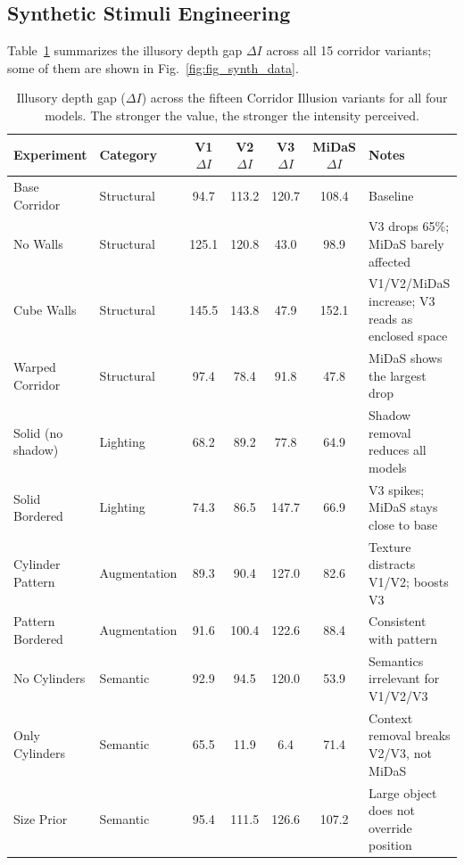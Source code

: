 \documentclass[10pt,twocolumn]{article}
\begin{document}
\subsection{Synthetic Stimuli Engineering}

Table~\ref{tab:corridor} summarizes the illusory depth gap $\Delta I$ across all 15
corridor variants; some of them are shown in Fig.~\ref{fig:fig_synth_data}. 
\begin{table}[t]
\centering
\caption{Illusory depth gap ($\Delta I$) across the fifteen Corridor Illusion variants for
all four models.  The stronger the value, the stronger the intensity perceived.}
\label{tab:corridor}
\small
\setlength{\tabcolsep}{0pt} %
\begin{tabular*}{\textwidth}{@{\extracolsep{\fill}}llccccl@{}} %
\toprule
\textbf{Experiment} & \textbf{Category} & \textbf{V1 $\Delta I$} & \textbf{V2 $\Delta I$} & \textbf{V3 $\Delta I$} & \textbf{MiDaS $\Delta I$} & \textbf{Notes} \\
\midrule
Base Corridor        & Structural   & 94.7  & 113.2 & 120.7 & 108.4 & Baseline \\
No Walls             & Structural   & 125.1 & 120.8 &  43.0 &  98.9 & V3 drops 65\%; MiDaS barely affected \\
Cube Walls           & Structural   & 145.5 & 143.8 &  47.9 & 152.1 & V1/V2/MiDaS increase; V3 reads as enclosed space \\
Warped Corridor      & Structural   &  97.4 &  78.4 &  91.8 &  47.8 & MiDaS shows the largest drop \\
Solid (no shadow)    & Lighting     &  68.2 &  89.2 &  77.8 &  64.9 & Shadow removal reduces all models \\
Solid Bordered       & Lighting     &  74.3 &  86.5 & 147.7 &  66.9 & V3 spikes; MiDaS stays close to base \\
Cylinder Pattern     & Augmentation &  89.3 &  90.4 & 127.0 &  82.6 & Texture distracts V1/V2; boosts V3 \\
Pattern Bordered     & Augmentation &  91.6 & 100.4 & 122.6 &  88.4 & Consistent with pattern \\
No Cylinders & Semantic     &  92.9 &  94.5 & 120.0 &  53.9 & Semantics irrelevant for V1/V2/V3 \\
Only Cylinders       & Semantic     &  65.5 &  11.9 &   6.4 &  71.4 & Context removal breaks V2/V3, not MiDaS \\
Size Prior           & Semantic     &  95.4 & 111.5 & 126.6 & 107.2 & Large object does not override position \\

\end{tabular*}
\end{table}
\end{document}
